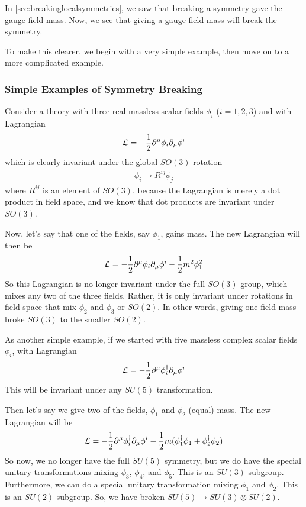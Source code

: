 \documentclass[12pt,epsf]{article}
\def\nolabel{\nonumber }
\def\nolabel{\nonumber }
\begin{document}
In \ref{sec:breakinglocalsymmetries}, we saw that breaking a symmetry
gave the gauge field mass.  Now, we see that giving a gauge field mass
will break the symmetry.  

To make this clearer, we begin with a very simple example, then move on
to a more complicated example.	

\subsubsection{Simple Examples of Symmetry Breaking}

Consider a theory with three real massless scalar fields $\phi_i$
($i=1,2,3$) and with Lagrangian
\begin{eqnarray}
\mathcal{L} = -{1\over 2} \partial^{\mu}\phi_i
\partial_{\mu}\phi^i\nolabel
\end{eqnarray}
which is clearly invariant under the global $SO(3)$ rotation
\begin{eqnarray}
\phi_i \rightarrow R^{ij}\phi_j\nolabel
\end{eqnarray}
where $R^{ij}$ is an element of $SO(3)$, because the Lagrangian is
merely a dot product in field space, and we know that dot products are
invariant under $SO(3)$.  

Now, let's say that one of the fields, say $\phi_1$, gains mass.  The
new Lagrangian will then be
\begin{eqnarray}
\mathcal{L} = -{1\over 2} \partial^{\mu}\phi_i \partial_{\mu}\phi^i -
{1\over 2} m^2 \phi^2_1\nolabel
\end{eqnarray}
So this Lagrangian is no longer invariant under the full $SO(3)$ group,
which mixes any two of the three fields.  Rather, it is only invariant
under rotations in field space that mix $\phi_2$ and $\phi_3$ or
$SO(2)$.  In other words, giving one field mass broke $SO(3)$ to the
smaller $SO(2)$.  

As another simple example, if we started with five massless complex
scalar fields $\phi_i$, with Lagrangian 
\begin{eqnarray}
\mathcal{L} = -{1\over 2} \partial^{\mu}\phi^{\dagger}_i
\partial_{\mu}\phi^i\nolabel
\end{eqnarray}
This will be invariant under any $SU(5)$ transformation.  

Then let's say we give two of the fields, $\phi_1$ and $\phi_2$ (equal)
mass.  The new Lagrangian will be 
\begin{eqnarray}
\mathcal{L} =
-{1\over2}\partial^{\mu}\phi_i^{\dagger}\partial_{\mu}\phi^i - {1\over
2}m(\phi^{\dagger}_1\phi_1 + \phi^{\dagger}_2 \phi_2)\nolabel
\end{eqnarray}
So now, we no longer have the full $SU(5)$ symmetry, but we do have the
special unitary transformations mixing $\phi_3$, $\phi_4$, and
$\phi_5$.  This is an $SU(3)$ subgroup.  Furthermore, we can do a
special unitary transformation mixing $\phi_1$ and $\phi_2$.  This is
an $SU(2)$ subgroup.  So, we have broken $SU(5) \rightarrow
SU(3)\otimes SU(2)$.  
\end{document}
